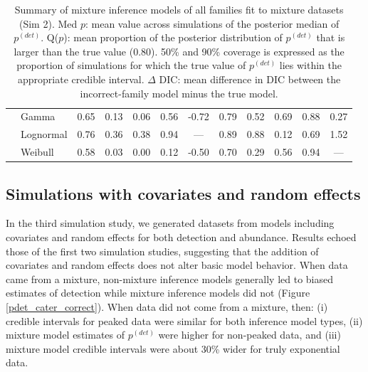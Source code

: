 \documentclass[useAMS,usenatbib,referee,12pt]{article}
\begin{document}
\begin{table}[ht]
\begin{tabular}{l|l|ccccc|ccccc}
\cline{2-12}
\parbox[t]{2mm}{} & Gamma & 0.65 & 0.13 & 0.06 & 0.56 & -0.72 & 0.79 & 0.52 & 0.69 & 0.88 & 0.27 \\ 
&   Lognormal & 0.76 & 0.36 & 0.38 & 0.94 & --- & 0.89 & 0.88 & 0.12 & 0.69 & 1.52 \\ 
&   Weibull & 0.58 & 0.03 & 0.00 & 0.12 & -0.50 & 0.70 & 0.29 & 0.56 & 0.94 & --- \\ 
   \hline
\end{tabular}
\caption{\label{tbl:sim2} Summary of mixture inference models of all families fit to mixture datasets (Sim 2).  
 Med $p$: mean value across simulations of the posterior median of $p^{(det)}$.  
Q($p$): mean proportion of the posterior distribution of $p^{(det)}$ that is larger than the true value (0.80).  
50\% and 90\% coverage is expressed as the proportion of simulations for which the true value of $p^{(det)}$ lies within the appropriate credible interval.  
$\Delta$ DIC: mean difference in DIC between the incorrect-family model minus the true model.}
\end{table}



\subsection{Simulations with covariates and random effects}\label{sec:simfull}

In the third simulation study, we generated datasets from models including covariates and random effects for both detection and abundance.  
Results echoed those of the first two simulation studies, suggesting that the addition of covariates and random effects does not alter basic model behavior.  
When data came from a mixture, non-mixture inference models generally led to biased estimates of detection while mixture inference models did not (Figure \ref{pdet_cater_correct}).  
When data did not come from a mixture, then: (i) credible intervals for peaked data were similar for both inference model types, (ii) mixture model estimates of $p^{(det)}$ were higher for non-peaked data, and (iii) mixture model credible intervals were about 30\% wider for truly exponential data.
\end{document}
